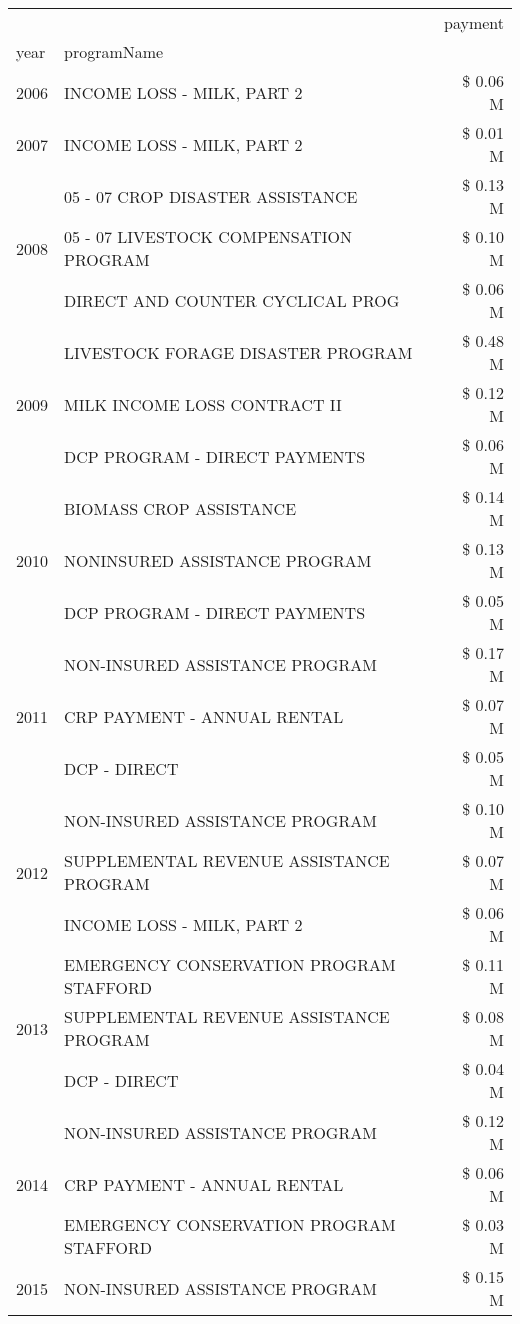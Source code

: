 \begin{tabular}{llr}
\toprule
 &  & payment \\
year & programName &  \\
\midrule
2006 & INCOME LOSS - MILK, PART 2 & \$ 0.06 M \\
\cline{1-3}
2007 & INCOME LOSS - MILK, PART 2 & \$ 0.01 M \\
\cline{1-3}
\multirow[t]{3}{*}{2008} & 05 - 07 CROP DISASTER ASSISTANCE & \$ 0.13 M \\
 & 05 - 07 LIVESTOCK COMPENSATION PROGRAM & \$ 0.10 M \\
 & DIRECT AND COUNTER CYCLICAL PROG & \$ 0.06 M \\
\cline{1-3}
\multirow[t]{3}{*}{2009} & LIVESTOCK FORAGE DISASTER  PROGRAM & \$ 0.48 M \\
 & MILK INCOME LOSS CONTRACT II & \$ 0.12 M \\
 & DCP PROGRAM - DIRECT PAYMENTS & \$ 0.06 M \\
\cline{1-3}
\multirow[t]{3}{*}{2010} & BIOMASS CROP ASSISTANCE & \$ 0.14 M \\
 & NONINSURED ASSISTANCE PROGRAM & \$ 0.13 M \\
 & DCP PROGRAM - DIRECT PAYMENTS & \$ 0.05 M \\
\cline{1-3}
\multirow[t]{3}{*}{2011} & NON-INSURED ASSISTANCE PROGRAM & \$ 0.17 M \\
 & CRP PAYMENT - ANNUAL RENTAL & \$ 0.07 M \\
 & DCP - DIRECT & \$ 0.05 M \\
\cline{1-3}
\multirow[t]{3}{*}{2012} & NON-INSURED ASSISTANCE PROGRAM & \$ 0.10 M \\
 & SUPPLEMENTAL REVENUE ASSISTANCE PROGRAM & \$ 0.07 M \\
 & INCOME LOSS - MILK, PART 2 & \$ 0.06 M \\
\cline{1-3}
\multirow[t]{3}{*}{2013} & EMERGENCY CONSERVATION PROGRAM STAFFORD & \$ 0.11 M \\
 & SUPPLEMENTAL REVENUE ASSISTANCE PROGRAM & \$ 0.08 M \\
 & DCP - DIRECT & \$ 0.04 M \\
\cline{1-3}
\multirow[t]{3}{*}{2014} & NON-INSURED ASSISTANCE PROGRAM & \$ 0.12 M \\
 & CRP PAYMENT - ANNUAL RENTAL & \$ 0.06 M \\
 & EMERGENCY CONSERVATION PROGRAM STAFFORD & \$ 0.03 M \\
\cline{1-3}
\multirow[t]{3}{*}{2015} & NON-INSURED ASSISTANCE PROGRAM & \$ 0.15 M \\

\end{tabular}
